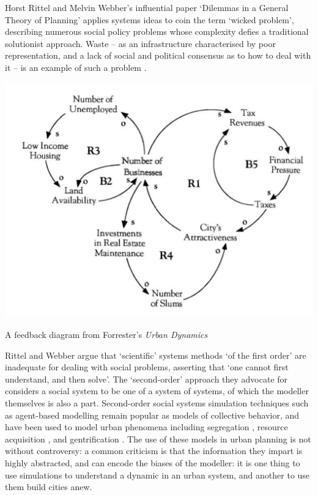 \documentclass[nofonts,nols,justified,nobib]{tufte-book}
\begin{document}
Horst Rittel and Melvin Webber's influential paper `Dilemmas in a General Theory of Planning' \cite{rittel_dilemmas_1973} applies systems ideas to coin the term `wicked problem', describing numerous social policy problems whose complexity defies a traditional solutionist approach. Waste -- as an infrastructure characterised by poor representation, and a lack of social and political consensus as to how to deal with it -- is an example of such a problem \cite{liboiron_trash_2012}. 
\begin{marginfigure}
\includegraphics[width=\textwidth]{img/1/urban-dynamics.jpg}
\caption{A feedback diagram from Forrester's \emph{Urban Dynamics} \cite{forrester_urban_1969} }
\end{marginfigure}
Rittel and Webber argue that `scientific' systems methods `of the first order' are inadequate for dealing with social problems, asserting that `one cannot first understand, and then solve'. The `second-order' approach they advocate for considers a social system to be one of a system of systems, of which the modeller themselves is also a part. Second-order social systems simulation techniques such as agent-based modelling remain popular as models of collective behavior, and have been used to model urban phenomena including segregation \cite{schelling_dynamic_1971}, resource acquisition \cite{epstein_growing_1996-1}, and gentrification \cite{batty_new_2013}. The use of these models in urban planning is not without controversy: a common criticism is that the information they impart is highly abstracted, and can encode the biases of the modeller: it is one thing to use simulations to understand a dynamic in an urban system, and another to use them build cities anew.
\end{document}
